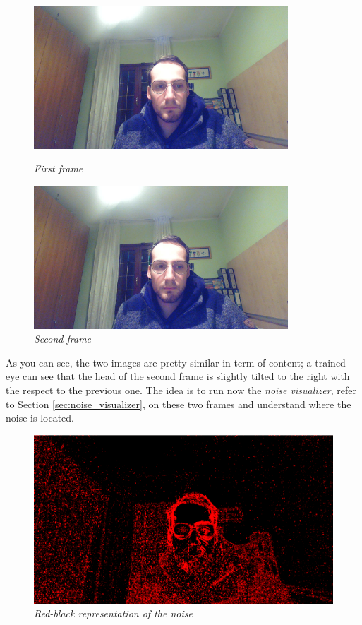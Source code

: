 \documentclass[paper=a4, fontsize=10pt]{scrartcl}	%
\begin{document}
	\begin{figure}[H]
		\centering
		\begin{minipage}[b]{0.45\textwidth}
			\centering
			\includegraphics[width=0.85\textwidth]{images/heatmap/f1.jpg}
			\caption{\textit{First frame}}
		\end{minipage}
		\hfill
		\begin{minipage}[b]{0.45\textwidth}
			\centering
			\includegraphics[width=0.85\textwidth]{images/heatmap/f2.jpg}
			\caption{\textit{Second frame}}
		\end{minipage}
	\end{figure}
	As you can see, the two images are pretty similar in term of content; a trained eye can see that the head of the second frame is slightly tilted to the right with the respect to the previous one. The idea is to run now the \textit{noise visualizer}, refer to Section \ref{sec:noise_visualizer}, on these two frames and understand where the noise is located.
	\begin{figure}[H]
		\centering
		\includegraphics[width=0.35\linewidth]{images/heatmap/noise_visual}
		\caption{\textit{Red-black representation of the noise}}
		\label{fig:noisevisual}
	\end{figure}
\end{document}

